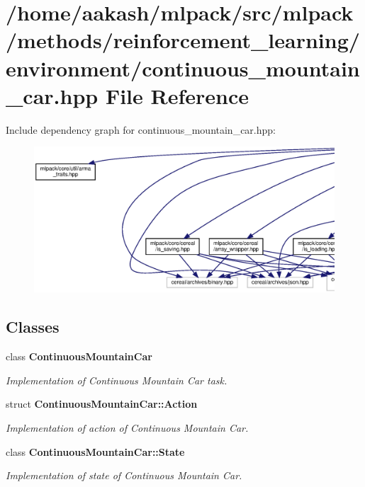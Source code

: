 \section{/home/aakash/mlpack/src/mlpack/methods/reinforcement\+\_\+learning/environment/continuous\+\_\+mountain\+\_\+car.hpp File Reference}
\label{continuous__mountain__car_8hpp}
Include dependency graph for continuous\+\_\+mountain\+\_\+car.\+hpp\+:
\nopagebreak
\begin{figure}[H]
\begin{center}
\leavevmode
\includegraphics[width=350pt]{continuous__mountain__car_8hpp__incl}
\end{center}
\end{figure}
\subsection*{Classes}
\begin{DoxyCompactItemize}
\item 
class \textbf{ Continuous\+Mountain\+Car}
\begin{DoxyCompactList}\small\item\em Implementation of Continuous Mountain Car task. \end{DoxyCompactList}\item 
struct \textbf{ Continuous\+Mountain\+Car\+::\+Action}
\begin{DoxyCompactList}\small\item\em Implementation of action of Continuous Mountain Car. \end{DoxyCompactList}\item 
class \textbf{ Continuous\+Mountain\+Car\+::\+State}
\begin{DoxyCompactList}\small\item\em Implementation of state of Continuous Mountain Car. \end{DoxyCompactList}\end{DoxyCompactItemize}
